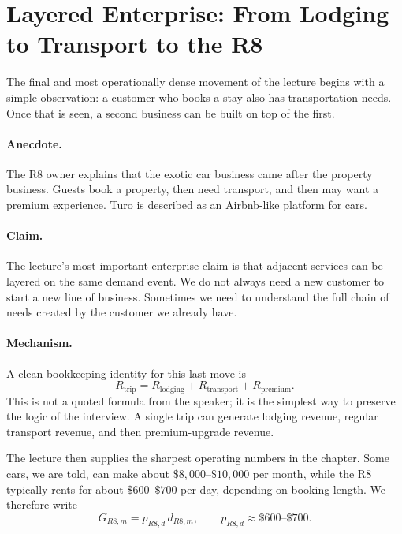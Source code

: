 \section{Layered Enterprise: From Lodging to Transport to the R8}

The final and most operationally dense movement of the lecture begins with a simple observation: a customer who books a stay also has transportation needs. Once that is seen, a second business can be built on top of the first.

\paragraph{Anecdote.}
The R8 owner explains that the exotic car business came after the property business. Guests book a property, then need transport, and then may want a premium experience. Turo is described as an Airbnb-like platform for cars.

\paragraph{Claim.}
The lecture's most important enterprise claim is that adjacent services can be layered on the same demand event. We do not always need a new customer to start a new line of business. Sometimes we need to understand the full chain of needs created by the customer we already have.

\paragraph{Mechanism.}
A clean bookkeeping identity for this last move is
\begin{equation}
R_{\mathrm{trip}}
=
R_{\mathrm{lodging}}
+
R_{\mathrm{transport}}
+
R_{\mathrm{premium}}.
\end{equation}
This is not a quoted formula from the speaker; it is the simplest way to preserve the logic of the interview. A single trip can generate lodging revenue, regular transport revenue, and then premium-upgrade revenue.

The lecture then supplies the sharpest operating numbers in the chapter. Some cars, we are told, can make about \(\$8{,}000\text{--}\$10{,}000\) per month, while the R8 typically rents for about \(\$600\text{--}\$700\) per day, depending on booking length. We therefore write
\begin{equation}
G_{R8,m}=p_{R8,d}\,d_{R8,m},
\qquad
p_{R8,d}\approx \$600\text{--}\$700.
\end{equation}

